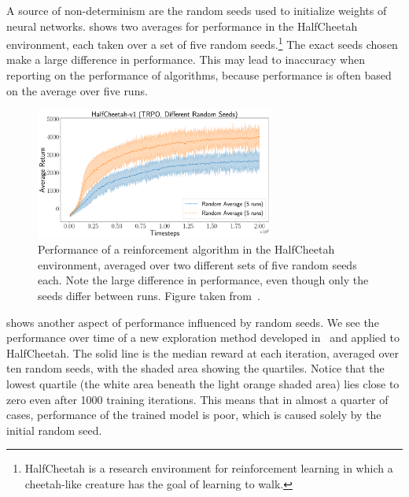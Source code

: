 \documentclass[11pt, a4paper]{report} %
\begin{document}
A source of non-determinism are the random seeds used to initialize weights of neural networks.
 shows two averages for performance in the HalfCheetah environment, each taken over a set of five random seeds.\footnote{HalfCheetah is a research environment for reinforcement learning in which a cheetah-like creature has the goal of learning to walk.}
The exact seeds chosen make a large difference in performance.
This may lead to inaccuracy when reporting on the performance of algorithms, because performance is often based on the average over five runs.

\begin{figure}[tb!]
  \centering \includegraphics[width=0.7\textwidth]{HalfCheetah-v1__TRPO,_Different_Random_Seeds_.pdf}
  \caption{Performance of a reinforcement algorithm in the HalfCheetah environment, averaged over two different sets of five random seeds each. Note the large difference in performance, even though only the seeds differ between runs. Figure taken from~\cite{1709.06560}.}\label{fig:halfcheetahdifferentresults}
\end{figure}


 shows another aspect of performance influenced by random seeds.
We see the performance over time of a new exploration method developed in~\cite{houthooft16_vime} and applied to HalfCheetah.
The solid line is the median reward at each iteration, averaged over ten random seeds, with the shaded area showing the quartiles.
Notice that the lowest quartile (the white area beneath the light orange shaded area) lies close to zero even after 1000 training iterations.
This means that in almost a quarter of cases, performance of the trained model is poor, which is caused solely by the initial random seed.
\end{document}
